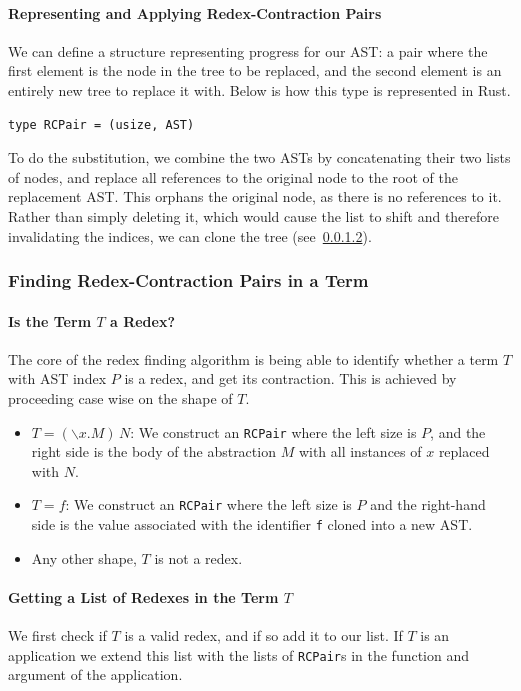 \paragraph{Representing and Applying Redex-Contraction Pairs}
We can define a structure representing progress for our \ac{AST}: a pair where the first element is the node in the tree to be replaced, and the second element is an entirely new tree to replace it with. Below is how this type is represented in Rust. 
\begin{lstlisting}[language=Rust_boxed]
type RCPair = (usize, AST)
\end{lstlisting}
\noindent To do the substitution, we combine the two \ac{AST}s by concatenating their two lists of nodes, and replace all references to the original node to the root of the replacement \ac{AST}. This orphans the original node, as there is no references to it. Rather than simply deleting it, which would cause the list to shift and therefore invalidating the indices, we can clone the tree (see~\ref{}). 

\subsubsection{Finding Redex-Contraction Pairs in a Term}
\paragraph{Is the Term $T$ a Redex?}
The core of the redex finding algorithm is being able to identify whether a term $T$ with \ac{AST} index $P$ is a redex, and get its contraction. This is achieved by proceeding case wise on the shape of $T$.
\begin{itemize}
    \item $T = (\backslash x. M)\, N$: We construct an \verb|RCPair| where the left size is $P$, and the right side is the body of the abstraction $M$ with all instances of $x$ replaced with $N$. 
    \item $T = f$: We construct an \verb|RCPair| where the left size is $P$ and the right-hand side is the value associated with the identifier \verb|f| cloned into a new \ac{AST}. 
    \item Any other shape, $T$ is not a redex. 
\end{itemize}

\paragraph{Getting a List of Redexes in the Term $T$}
We first check if $T$ is a valid redex, and if so add it to our list. If $T$ is an application we extend this list with the lists of \verb|RCPair|s in the function and argument of the application. 


